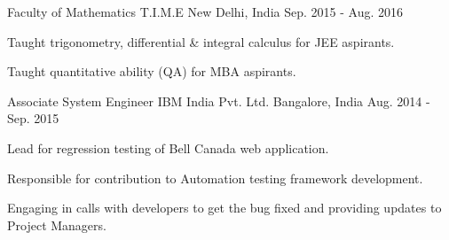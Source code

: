 \begin{cventries}
  \cventry
    {Faculty of Mathematics} %
    {T.I.M.E} %
    {New Delhi, India} %
    {Sep. 2015 - Aug. 2016} %
    {
      \begin{cvitems} %
        \item {Taught trigonometry, differential \& integral calculus for JEE aspirants.}
        \item {Taught quantitative ability (QA) for MBA aspirants.}
      \end{cvitems}
    }

  \cventry
    {Associate System Engineer} %
    {IBM India Pvt. Ltd.} %
    {Bangalore, India} %
    {Aug. 2014 - Sep. 2015} %
    {
      \begin{cvitems} %
        \item {Lead for regression testing of Bell Canada web application.}
        \item {Responsible for contribution to Automation testing framework development.}
        \item {Engaging in calls with developers to get the bug fixed and providing updates to  Project Managers.}
      \end{cvitems}
    }

\end{cventries}

